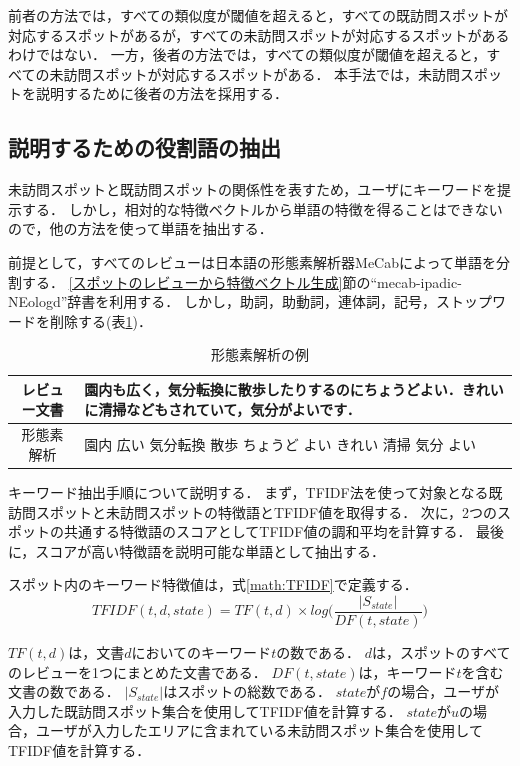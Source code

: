 \documentclass{deimj}
\begin{document}
前者の方法では，すべての類似度が閾値を超えると，すべての既訪問スポットが対応するスポットがあるが，すべての未訪問スポットが対応するスポットがあるわけではない．
一方，後者の方法では，すべての類似度が閾値を超えると，すべての未訪問スポットが対応するスポットがある．
本手法では，未訪問スポットを説明するために後者の方法を採用する．

\subsection{説明するための役割語の抽出}
\label{subsec:説明するための役割語の抽出}
未訪問スポットと既訪問スポットの関係性を表すため，ユーザにキーワードを提示する．
しかし，相対的な特徴ベクトルから単語の特徴を得ることはできないので，他の方法を使って単語を抽出する．

前提として，すべてのレビューは日本語の形態素解析器MeCabによって単語を分割する．
\ref{スポットのレビューから特徴ベクトル生成}節の``mecab-ipadic-NEologd''辞書を利用する．
しかし，助詞，助動詞，連体詞，記号，ストップワードを削除する(表\ref{table:mecab})．

\begin{table}[t]
  \caption{形態素解析の例}
  \label{table:mecab}
  \centering
    \begin{tabular}{c|p{}} \hline
      レビュー文書 & 園内も広く，気分転換に散歩したりするのにちょうどよい．きれいに清掃などもされていて，気分がよいです．\\
      \hline
      形態素解析 & 園内 広い 気分転換 散歩 ちょうど よい きれい 清掃 気分 よい\\
      \hline
    \end{tabular}
\end{table}

キーワード抽出手順について説明する．
まず，TFIDF法を使って対象となる既訪問スポットと未訪問スポットの特徴語とTFIDF値を取得する．
次に，2つのスポットの共通する特徴語のスコアとしてTFIDF値の調和平均を計算する．
最後に，スコアが高い特徴語を説明可能な単語として抽出する．

スポット内のキーワード特徴値は，式\ref{math:TFIDF}で定義する．
\begin{equation}
  TFIDF(t,d,state) = TF(t,d) \times log\Biggr(\frac{|S_{state}|}{DF(t,state)}\Biggr)
  \label{math:TFIDF}
\end{equation}

$TF(t,d)$は，文書$d$においてのキーワード$t$の数である．
$d$は，スポットのすべてのレビューを1つにまとめた文書である．
$DF(t,state)$は，キーワード$t$を含む文書の数である．
$|S_{state}|$はスポットの総数である．
$state$が$f$の場合，ユーザが入力した既訪問スポット集合を使用してTFIDF値を計算する．
$state$が$u$の場合，ユーザが入力したエリアに含まれている未訪問スポット集合を使用してTFIDF値を計算する．
\end{document}

